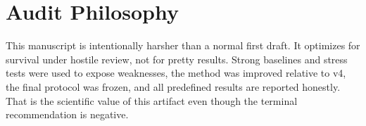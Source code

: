 \documentclass{article}
\begin{document}
\section{Audit Philosophy}
This manuscript is intentionally harsher than a normal first draft. It optimizes for survival under hostile review, not for pretty results. Strong baselines and stress tests were used to expose weaknesses, the method was improved relative to v4, the final protocol was frozen, and all predefined results are reported honestly. That is the scientific value of this artifact even though the terminal recommendation is negative.



\end{document}
